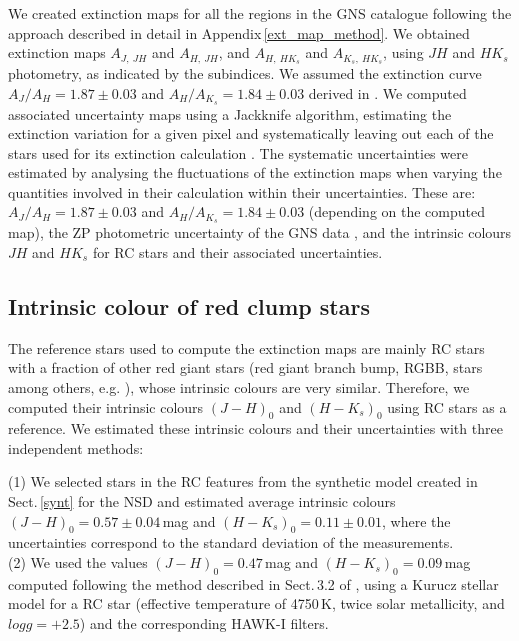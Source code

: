 \documentclass{aa}
\begin{document}
We created extinction maps for all the regions in the GNS catalogue following the approach described in detail in Appendix\,\ref{ext_map_method}. We obtained extinction maps $A_{J,\ JH}$ and $A_{H,\ JH}$, and $A_{H,\ HK_s}$ and $A_{K_s,\ HK_s}$, using $JH$ and $HK_s$ photometry, as indicated by the subindices. We assumed the extinction curve $A_J/A_H=1.87\pm0.03$ and $A_H/A_{K_s} =1.84\pm0.03$ derived in \citet{Nogueras-Lara:2020aa}. We computed associated uncertainty maps using a Jackknife algorithm, estimating the extinction variation for a given pixel and  systematically leaving out each of the stars used for its extinction calculation \citep[for further details see Sect.\,7 in][]{Nogueras-Lara:2018aa}. The systematic uncertainties were estimated by analysing the fluctuations of the extinction maps when varying the quantities involved in their calculation within their uncertainties. These are: $A_J/A_H=1.87\pm0.03$ and $A_H/A_{K_s} =1.84\pm0.03$ (depending on the computed map), the ZP photometric uncertainty of the GNS data \citep[0.04\,mag for $JHK_s$)][]{Nogueras-Lara:2019aa}, and the intrinsic colours $JH$ and $HK_s$ for RC stars and their associated uncertainties. 

 
\subsection{Intrinsic colour of red clump stars}
\label{intrinsic}

The reference stars used to compute the extinction maps are mainly RC stars with a fraction of other red giant stars (red giant branch bump, RGBB, stars among others, e.g. \citealt{Nogueras-Lara:2018ab}), whose intrinsic colours are very similar. Therefore, we computed their intrinsic colours $(J-H)_0$ and $(H-K_s)_0$ using RC stars as a reference. We estimated these intrinsic colours and their uncertainties with three independent methods:




(1) We selected stars in the RC features from the synthetic model created in Sect.\,\ref{synt} for the NSD and estimated average intrinsic colours $(J-H)_0=0.57\pm0.04$\,mag and $(H-K_s)_0=0.11\pm0.01$, where the uncertainties correspond to the standard deviation of the measurements.\\ 


(2) We used the values $(J-H)_0=0.47$\,mag and $(H-K_s)_0=0.09$\,mag computed following the method described in Sect.\,3.2 of \citet{Nogueras-Lara:2020aa}, using a Kurucz stellar model \citep{Kurucz:1993fk} for a RC star (effective temperature of 4750\,K, twice solar metallicity, and $log g = +2.5$) and the corresponding HAWK-I filters.\\
\end{document}
